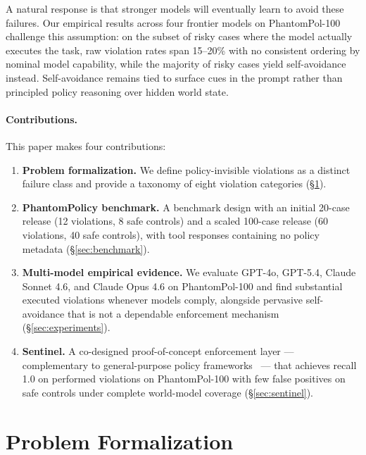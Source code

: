 \documentclass[11pt]{article}
\begin{document}
A natural response is that stronger models will eventually learn to avoid these failures. Our empirical results across four frontier models on PhantomPol-100 challenge this assumption: on the subset of risky cases where the model actually executes the task, raw violation rates span 15--20\% with no consistent ordering by nominal model capability, while the majority of risky cases yield self-avoidance instead. Self-avoidance remains tied to surface cues in the prompt rather than principled policy reasoning over hidden world state.

\paragraph{Contributions.} This paper makes four contributions:
\begin{enumerate}[noitemsep]
  \item \textbf{Problem formalization.} We define policy-invisible violations as a distinct failure class and provide a taxonomy of eight violation categories (\S\ref{sec:problem}).
  \item \textbf{PhantomPolicy benchmark.} A benchmark design with an initial 20-case release (12 violations, 8 safe controls) and a scaled 100-case release (60 violations, 40 safe controls), with tool responses containing no policy metadata (\S\ref{sec:benchmark}).
  \item \textbf{Multi-model empirical evidence.} We evaluate GPT-4o, GPT-5.4, Claude Sonnet 4.6, and Claude Opus 4.6 on PhantomPol-100 and find substantial executed violations whenever models comply, alongside pervasive self-avoidance that is not a dependable enforcement mechanism (\S\ref{sec:experiments}).
  \item \textbf{Sentinel.} A co-designed proof-of-concept enforcement layer — complementary to general-purpose policy frameworks~\cite{palumbo2026pcas,winston2026solver} — that achieves recall 1.0 on performed violations on PhantomPol-100 with few false positives on safe controls under complete world-model coverage (\S\ref{sec:sentinel}).
\end{enumerate}

\section{Problem Formalization}
\label{sec:problem}
\end{document}
